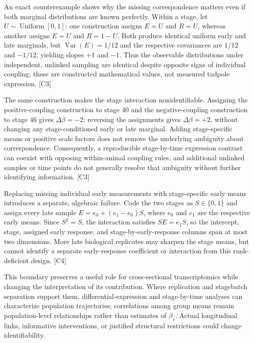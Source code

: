 \documentclass[11pt]{article}
\begin{document}
An exact counterexample shows why the missing correspondence matters even if both marginal distributions are known perfectly. Within a stage, let $U\sim\operatorname{Uniform}[0,1]$: one construction assigns $E=U$ and $R=U$, whereas another assigns $E=U$ and $R=1-U$. Both produce identical uniform early and late marginals, but $\operatorname{Var}(E)=1/12$ and the respective covariances are $1/12$ and $-1/12$, yielding slopes $+1$ and $-1$. Thus the observable distributions under independent, unlinked sampling are identical despite opposite signs of individual coupling; these are constructed mathematical values, not measured tadpole expression. [C3]

The same construction makes the stage interaction nonidentifiable. Assigning the positive-coupling construction to stage 40 and the negative-coupling construction to stage 46 gives $\Delta\beta=-2$; reversing the assignments gives $\Delta\beta=+2$, without changing any stage-conditioned early or late marginal. Adding stage-specific means or positive scale factors does not remove the underlying ambiguity about correspondence. Consequently, a reproducible stage-by-time expression contrast can coexist with opposing within-animal coupling rules, and additional unlinked samples or time points do not generally resolve that ambiguity without further identifying information. [C3]

Replacing missing individual early measurements with stage-specific early means introduces a separate, algebraic failure. Code the two stages as $S\in\{0,1\}$ and assign every late sample $E=e_0+(e_1-e_0)S$, where $e_0$ and $e_1$ are the respective early means. Since $S^2=S$, the interaction satisfies $SE=e_1S$, so the intercept, stage, assigned early response, and stage-by-early-response columns span at most two dimensions. More late biological replicates may sharpen the stage means, but cannot identify a separate early-response coefficient or interaction from this rank-deficient design. [C4]

This boundary preserves a useful role for cross-sectional transcriptomics while changing the interpretation of its contribution. Where replication and stage\textendash{}batch separation support them, differential-expression and stage-by-time analyses can characterize population trajectories; correlations among group means remain population-level relationships rather than estimates of $\beta_s$. Actual longitudinal links, informative interventions, or justified structural restrictions could change identifiability.
\end{document}
